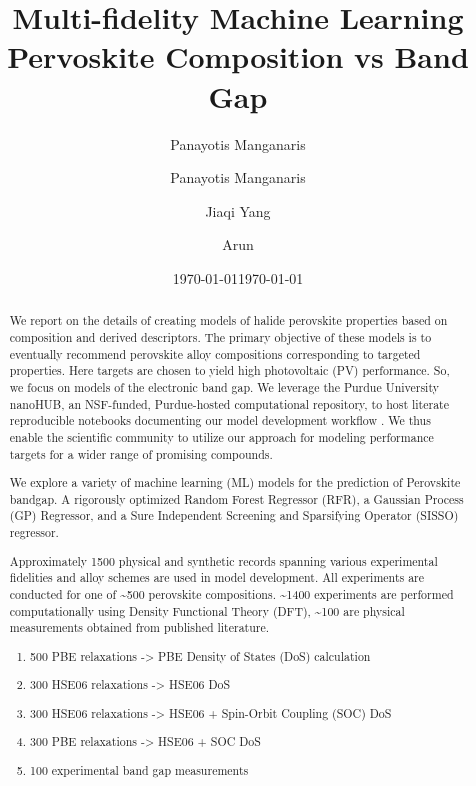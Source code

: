 \documentclass[aip, jmp, amsmath, amssymb, nofootinbib]{revtex4-2}
\author{Panayotis Manganaris}
\date{\today}
\title{}
\begin{document}
\title{%
Multi-fidelity Machine Learning Pervoskite Composition vs Band Gap
}

\author{Panayotis Manganaris}
\author{Jiaqi Yang}
\author{Arun }

\date{\today}
\maketitle
\begin{abstract}
We report on the details of creating models of halide perovskite properties based on composition and derived
descriptors. The primary objective of these models is to eventually recommend perovskite alloy compositions
corresponding to targeted properties. Here targets are chosen to yield high photovoltaic (PV) performance. So, we focus
on models of the electronic band gap. We leverage the Purdue University nanoHUB, an NSF-funded, Purdue-hosted
computational repository, to host literate reproducible notebooks documenting our model development workflow
\cite{manganaris-2022-mrs-comput}. We thus enable the scientific community to utilize our approach for modeling
performance targets for a wider range of promising compounds.

We explore a variety of machine learning (ML) models for the prediction of Perovskite bandgap. A rigorously optimized
Random Forest Regressor (RFR), a Gaussian Process (GP) Regressor, and a Sure Independent Screening and Sparsifying
Operator\cite{ouyang-2018-sisso} (SISSO) regressor.

Approximately 1500 physical and synthetic records spanning various experimental fidelities and alloy schemes are used in
model development. All experiments are conducted for one of \textasciitilde{}500 perovskite compositions. \textasciitilde{}1400 experiments are
performed computationally using Density Functional Theory (DFT), \textasciitilde{}100 are physical measurements obtained from published
literature\cite{almora-2020-devic-perfor,jiang-2006-predic-lattic,briones-2021-accel-lattic}.

\begin{enumerate}
\item 500 PBE relaxations -> PBE Density of States (DoS) calculation
\item 300 HSE06 relaxations -> HSE06 DoS
\item 300 HSE06 relaxations -> HSE06 + Spin-Orbit Coupling (SOC) DoS
\item 300 PBE relaxations -> HSE06 + SOC DoS
\item 100 experimental band gap measurements
\end{enumerate}


\end{abstract}
\end{document}
